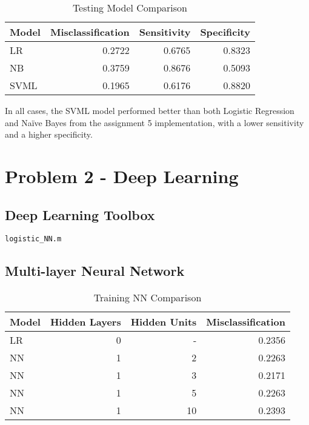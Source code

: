 \documentclass[12pt, letterpaper]{report}
\begin{document}
\begin{table}[H]
	\centering
	\begin{tabular}{ |l|r|r|r| }
		\hline
		\textbf{Model} & \textbf{Misclassification} & \textbf{Sensitivity} & \textbf{Specificity} \\
		\hline
		LR & 0.2722 & 0.6765 & 0.8323 \\
		\hline
		NB & 0.3759 & 0.8676 & 0.5093 \\
		\hline
		SVML & 0.1965 & 0.6176 & 0.8820 \\
		\hline
	\end{tabular}
	\caption{Testing Model Comparison}
\end{table}

In all cases, the SVML model performed better than both Logistic Regression and Naïve Bayes from the assignment 5 implementation, with a lower sensitivity and a higher specificity.

\section{Problem 2 - Deep Learning}

\subsection{Deep Learning Toolbox}

\begin{verbatim}
logistic_NN.m
\end{verbatim}

\subsection{Multi-layer Neural Network}

\begin{table}[H]
	\centering
	\begin{tabular}{ |l|r|r|r| }
		\hline
		\textbf{Model} & \textbf{Hidden Layers} & \textbf{Hidden Units} & \textbf{Misclassification} \\
		\hline
		LR & 0 & - & 0.2356 \\
		\hline
		NN & 1 & 2 & 0.2263 \\
		\hline
		NN & 1 & 3 & 0.2171 \\
		\hline
		NN & 1 & 5 & 0.2263 \\
		\hline
		NN & 1 & 10 & 0.2393 \\
		\hline
	\end{tabular}
	\caption{Training NN Comparison}
\end{table}
\end{document}
